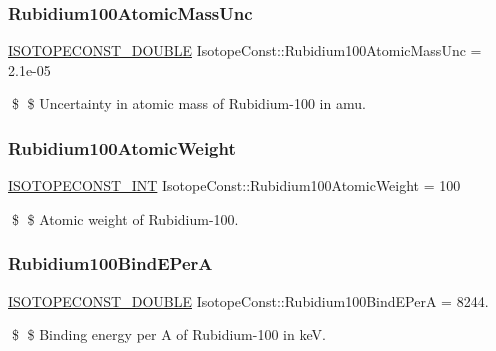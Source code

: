 \subsubsection{\texorpdfstring{Rubidium100\+Atomic\+Mass\+Unc}{Rubidium100AtomicMassUnc}}
{\footnotesize\ttfamily \mbox{\hyperlink{group___isotope_const-_macros_ga8f45a7272ce02c0b4c65c44636ed719a}{I\+S\+O\+T\+O\+P\+E\+C\+O\+N\+S\+T\+\_\+\+D\+O\+U\+B\+LE}} Isotope\+Const\+::\+Rubidium100\+Atomic\+Mass\+Unc = 2.\+1e-\/05}

\$ \$ Uncertainty in atomic mass of Rubidium-\/100 in amu. \mbox{\label{group___isotope_const-_rubidium-_rb100_ga1c836a3aaba072f6c6bdcdac6f225df7}} 
\subsubsection{\texorpdfstring{Rubidium100\+Atomic\+Weight}{Rubidium100AtomicWeight}}
{\footnotesize\ttfamily \mbox{\hyperlink{group___isotope_const-_macros_ga5f18360b3e99483a35c32d789e62621c}{I\+S\+O\+T\+O\+P\+E\+C\+O\+N\+S\+T\+\_\+\+I\+NT}} Isotope\+Const\+::\+Rubidium100\+Atomic\+Weight = 100}

\$ \$ Atomic weight of Rubidium-\/100. \mbox{\label{group___isotope_const-_rubidium-_rb100_gad32be9924bd157eb2fce7a2285ad655d}} 
\subsubsection{\texorpdfstring{Rubidium100\+Bind\+E\+PerA}{Rubidium100BindEPerA}}
{\footnotesize\ttfamily \mbox{\hyperlink{group___isotope_const-_macros_ga8f45a7272ce02c0b4c65c44636ed719a}{I\+S\+O\+T\+O\+P\+E\+C\+O\+N\+S\+T\+\_\+\+D\+O\+U\+B\+LE}} Isotope\+Const\+::\+Rubidium100\+Bind\+E\+PerA = 8244.}

\$ \$ Binding energy per A of Rubidium-\/100 in keV. \mbox{\label{group___isotope_const-_rubidium-_rb100_gac4d08eedbff23b03c733be8b4b73ab94}} 

